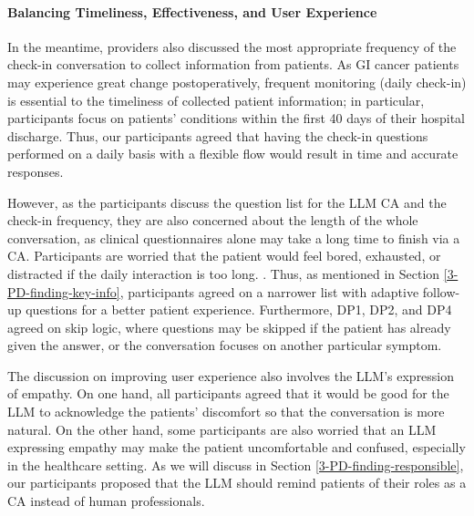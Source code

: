 \paragraph{Balancing Timeliness, Effectiveness, and User Experience}
\label{3-PD-finding-time}

In the meantime, providers also discussed the most appropriate frequency of the check-in conversation to collect information from patients. As GI cancer patients may experience great change postoperatively, frequent monitoring (\eg daily check-in) is essential to the timeliness of collected patient information; in particular, participants focus on patients' conditions within the first 40 days of their hospital discharge. Thus, our participants agreed that having the check-in questions performed on a daily basis with a flexible flow would result in time and accurate responses.

However, as the participants discuss the question list for the LLM CA and the check-in frequency, they are also concerned about the length of the whole conversation, as clinical questionnaires alone may take a long time to finish via a CA. Participants are worried that the patient would feel bored, exhausted, or distracted if the daily interaction is too long. . Thus, as mentioned in Section \ref{3-PD-finding-key-info}, participants agreed on a narrower list with adaptive follow-up questions for a better patient experience. Furthermore, DP1, DP2, and DP4 agreed on skip logic, where questions may be skipped if the patient has already given the answer, or the conversation focuses on another particular symptom.

The discussion on improving user experience also involves the LLM's expression of empathy. On one hand, all participants agreed that it would be good for the LLM to acknowledge the patients' discomfort so that the conversation is more natural.
On the other hand, some participants are also worried that an LLM expressing empathy may make the patient uncomfortable and confused, especially in the healthcare setting. As we will discuss in Section \ref{3-PD-finding-responsible}, our participants proposed that the LLM should remind patients of their roles as a CA instead of human professionals.


